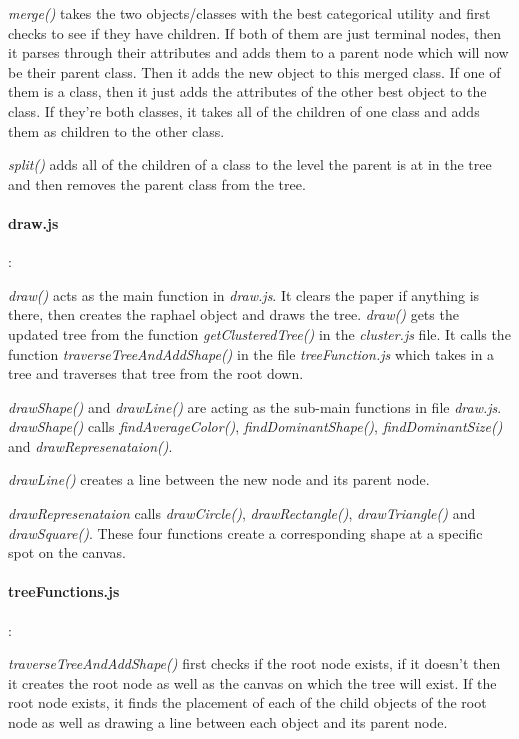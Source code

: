 \emph{merge()} takes the two objects/classes with the best categorical utility and first checks to see if they have children. If both of them are just terminal nodes, then it parses through their attributes and adds them to a parent node which will now be their parent class. Then it adds the new object to this merged class. If one of them is a class, then it just adds the attributes of the other best object to the class. If they're both classes, it takes all of the children of one class and adds them as children to the other class.

\emph{split()} adds all of the children of a class to the level the parent is at in the tree and then removes the parent class from the tree.

\paragraph{draw.js}:

\emph{draw()} acts as the main function in \emph{draw.js}. It clears the paper if anything is there, then creates the raphael object and draws the tree. \emph{draw()} gets the updated tree from the function \emph{getClusteredTree()} in the \emph{cluster.js} file. It calls the function \emph{traverseTreeAndAddShape()} in the file \emph{treeFunction.js} which takes in a tree and traverses that tree from the root down.

\emph{drawShape()} and \emph{drawLine()} are acting as the sub-main functions in file \emph{draw.js}. \emph{drawShape()} calls \emph{findAverageColor()}, \emph{findDominantShape()}, \emph{findDominantSize()} and \emph{drawRepresenataion()}. 

\emph{drawLine()} creates a line between the new node and its parent node.

\emph{drawRepresenataion} calls  \emph{drawCircle()}, \emph{drawRectangle()},  \emph{drawTriangle()} and  \emph{drawSquare()}. These four functions create a corresponding shape at a specific spot on the canvas.
    
\paragraph{treeFunctions.js}:

\emph{traverseTreeAndAddShape()} first checks if the root node exists, if it doesn't then it creates the root node as well as the canvas on which the tree will exist. If the root node exists, it finds the placement of each of the child objects of the root node as well as drawing a line between each object and its parent node. 

